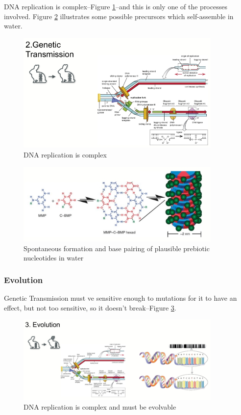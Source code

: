 \documentclass[]{article}
\begin{document}
DNA replication is complex--Figure \ref{fig:DNA_replication_complex}--and this is only one of the processes involved. Figure \ref{fig:SpontaneousFormation}\cite{cafferty2016spontaneous} illustrates some possible precursors which self-assemble in water. 
\begin{figure}[H]
	\caption{DNA replication is complex}\label{fig:DNA_replication_complex}
	\includegraphics[width=0.9\textwidth]{DNA_replication_complex}
\end{figure}

\begin{figure}[H]
	\caption{Spontaneous formation and base pairing of plausible prebiotic nucleotides in water}\label{fig:SpontaneousFormation}
	\includegraphics[width=0.9\textwidth]{SpontaneousFormation}
\end{figure}

\subsubsection{Evolution}

Genetic Transmission must ve sensitive enough to mutations for it to have an effect, but not too sensitive, so it doesn't break--Figure \ref{fig:EvolutionOfEvolution}.
\begin{figure}[H]
	\caption{DNA replication is complex and must be evolvable}\label{fig:EvolutionOfEvolution}
	\includegraphics[width=0.9\textwidth]{EvolutionOfEvolution}
\end{figure}
\end{document}
